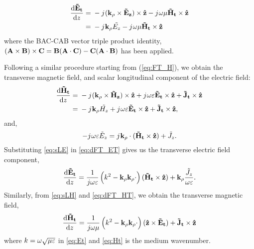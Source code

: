 \documentclass[12pt]{article}
\begin{document}
%
\begin{equation}
  \begin{split}
    \dv{\v{\ti{E}_t}}{z} ={}& -\j (\v{k_{\p}} \x \v{\ti{E}_z}) \x \v{\^{z}}
    -\j \O \u \v{\ti{H}_t} \x \v{\^{z}}\\
    ={}& -\j \v{k_{\p}} \ti{{E}_z} -\j \O \u \v{\ti{H}_t} \x \v{\^{z}}
  \end{split}
  \label{eq:dFT_ET}%
\end{equation}
%
where the BAC-CAB vector triple product identity, $(\mathbf{A} \times \mathbf{B})\times\mathbf{C} = \mathbf{B}(\mathbf{A} \cdot \mathbf{C}) - \mathbf{C}(\mathbf{A} \cdot \mathbf{B})$ has been applied.

Following a similar procedure starting from (\ref{eq:FT_H}), we obtain the transverse magnetic field, and scalar longitudinal component of the electric field:
%
\begin{equation}
  \begin{split}
    \dv{\v{\ti{H}_t}}{z} ={}& -\j (\v{k_{\p}} \x \v{\ti{H}_z}) \x \v{\^{z}}
    + \j \O \E \v{\ti{E}_t} \x \v{\^{z}} +
    \v{\ti{J}_t} \x \v{\^{z}} \\
    ={}& -\j \v{k_{\p}} \ti{{H}_z} + \j \O \E \v{\ti{E}_t} \x \v{\^{z}}  +
    \v{\ti{J}_t} \x \v{\^{z}},
  \end{split}
  \label{eq:dFT_HT}%
\end{equation}
%
and,
\begin{equation}
  -j\mkern1mu \omega \varepsilon \tilde{E}_z =
  j\mkern1mu \mathbf{k_{\rho}} \cdot (\mathbf{\tilde{H}_t} \times \mathbf{\hat{z}}) + {\tilde{J}_z}.
  \label{eq:sLE}
\end{equation}
%
Substituting \eqref{eq:sLE} in \eqref{eq:dFT_ET} gives us the transverse electric field component,
%
\begin{equation}
  \dv{\mathbf{\tilde{E}_t}}{z} =
  \frac{1}{j \omega \varepsilon} \left( k^2 - \mathbf{k_{\rho}}\mathbf{k_{\rho}} \cdot \right) (\mathbf{\tilde{H}_t} \times \mathbf{\hat{z}}) + \mathbf{k_{\rho}} \frac{\tilde{J}_z}{\omega \varepsilon}.
  \label{eq:Et}
\end{equation}
%
Similarly, from \eqref{eq:sLH} and \eqref{eq:dFT_HT}, we obtain the transverse magnetic field,
%
\begin{equation}
  \dv{\mathbf{\tilde{H}_t}}{z} =
  \frac{1}{j \omega \mu} \left( k^2 - \mathbf{k_{\rho}}\mathbf{k_{\rho}} \cdot \right) (\mathbf{\hat{z}} \times \mathbf{\tilde{E}_t}) + \mathbf{\tilde{J}_t}
  \times \mathbf{\hat{z}}
  \label{eq:Ht}
\end{equation}
%
where $k = \omega \sqrt{\mu \varepsilon}$ in \eqref{eq:Et} and \eqref{eq:Ht} is the medium wavenumber.
\end{document}

